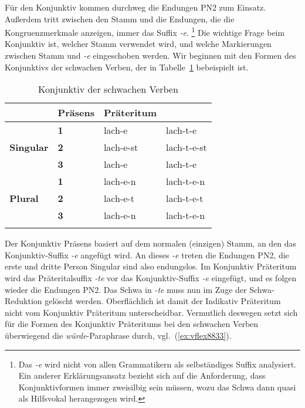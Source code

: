 \label{sec:konjflex}


Für den Konjunktiv kommen durchweg die Endungen PN2 zum Einsatz.
Außerdem tritt zwischen den Stamm und die Endungen, die die Kongruenzmerkmale anzeigen, immer das Suffix \textit{-e}.%
\footnote{Das \textit{-e} wird nicht von allen Grammatikern als selbständiges Suffix analysiert.
Ein anderer Erklärungsansatz bezieht sich auf die Anforderung, dass Konjunktivformen immer zweisilbig sein müssen, wozu das Schwa dann quasi als Hilfsvokal herangezogen wird.}
Die wichtige Frage beim Konjunktiv ist, welcher Stamm verwendet wird, und welche Markierungen zwischen Stamm und \textit{-e} eingeschoben werden.
Wir beginnen mit den Formen des Konjunktivs der schwachen Verben, der in Tabelle~\ref{tab:schwkonj} bebeispielt ist.

\begin{table}
  \centering
  \begin{tabular}{llll}
    \lsptoprule
    \multicolumn{2}{c}{} & \textbf{Präsens} & \textbf{Präteritum} \\
    \midrule
    \multirow{3}{*}{\textbf{Singular}} & \textbf{1} & lach-e & lach-t-e \\
    & \textbf{2} & lach-e-st & lach-t-e-st \\
    & \textbf{3} & lach-e & lach-t-e \\
    \midrule
    \multirow{3}{*}{\textbf{Plural}} & \textbf{1} & lach-e-n & lach-t-e-n \\
    & \textbf{2} & lach-e-t & lach-t-e-t \\
    & \textbf{3} & lach-e-n & lach-t-e-n \\
    \lspbottomrule
  \end{tabular}
  \caption{Konjunktiv der schwachen Verben}
  \label{tab:schwkonj}
\end{table}


Der Konjunktiv Präsens basiert auf dem normalen (einzigen) Stamm, an den das Konjunktiv-Suffix \textit{-e} angefügt wird.
An dieses \textit{-e} treten die Endungen PN2, die erste und dritte Person Singular sind also endungslos.
Im Konjunktiv Präteritum wird das Präteritalsuffix \textit{-te} vor das Konjunktiv-Suffix \textit{-e} eingefügt, und es folgen wieder die Endungen PN2.
Das Schwa in \textit{-te} muss nun im Zuge der Schwa-Reduktion gelöscht werden.
Oberflächlich ist damit der Indikativ Präteritum nicht vom Konjunktiv Präteritum unterscheidbar.
Vermutlich deswegen setzt sich für die Formen des Konjunktiv Präteritums bei den schwachen Verben überwiegend die \textit{würde}-Paraphrase durch, vgl.\ (\ref{ex:vflex8833}).

